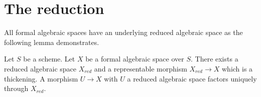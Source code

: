 \section{The reduction}
\label{section-reduction}

\noindent
All formal algebraic spaces have an underlying
reduced algebraic space as the following lemma demonstrates.

\begin{lemma}
\label{lemma-reduction-formal-algebraic-space}
Let $S$ be a scheme. Let $X$ be a formal algebraic space over $S$.
There exists a reduced algebraic space $X_{red}$ and a representable
morphism $X_{red} \to X$ which is a thickening. A morphism $U \to X$
with $U$ a reduced algebraic space factors uniquely through $X_{red}$.
\end{lemma}

